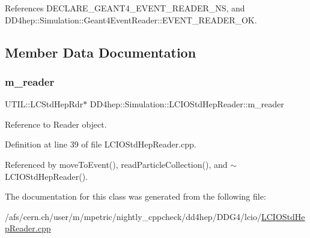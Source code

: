 References D\+E\+C\+L\+A\+R\+E\+\_\+\+G\+E\+A\+N\+T4\+\_\+\+E\+V\+E\+N\+T\+\_\+\+R\+E\+A\+D\+E\+R\+\_\+\+NS, and D\+D4hep\+::\+Simulation\+::\+Geant4\+Event\+Reader\+::\+E\+V\+E\+N\+T\+\_\+\+R\+E\+A\+D\+E\+R\+\_\+\+OK.



\subsection{Member Data Documentation}
\hypertarget{class_d_d4hep_1_1_simulation_1_1_l_c_i_o_std_hep_reader_a6545b15d1a2012ef556e97c33df91a98}{}\label{class_d_d4hep_1_1_simulation_1_1_l_c_i_o_std_hep_reader_a6545b15d1a2012ef556e97c33df91a98} 
\subsubsection{\texorpdfstring{m\+\_\+reader}{m\_reader}}
{\footnotesize\ttfamily U\+T\+I\+L\+::\+L\+C\+Std\+Hep\+Rdr$\ast$ D\+D4hep\+::\+Simulation\+::\+L\+C\+I\+O\+Std\+Hep\+Reader\+::m\+\_\+reader\hspace{0.3cm}{\ttfamily [protected]}}



Reference to Reader object. 



Definition at line 39 of file L\+C\+I\+O\+Std\+Hep\+Reader.\+cpp.



Referenced by move\+To\+Event(), read\+Particle\+Collection(), and $\sim$\+L\+C\+I\+O\+Std\+Hep\+Reader().



The documentation for this class was generated from the following file\+:\begin{DoxyCompactItemize}
\item 
/afs/cern.\+ch/user/m/mpetric/nightly\+\_\+cppcheck/dd4hep/\+D\+D\+G4/lcio/\hyperlink{_l_c_i_o_std_hep_reader_8cpp}{L\+C\+I\+O\+Std\+Hep\+Reader.\+cpp}\end{DoxyCompactItemize}
